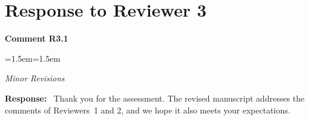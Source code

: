 \documentclass[11pt]{article}
\newcommand{\reviewer}[1]{\section*{Response to Reviewer #1}}
\newenvironment{comment}[1]
  {\par\medskip\noindent\textbf{Comment #1}\par
   \begin{list}{}{\leftmargin=1.5em\rightmargin=1.5em}\item\color{commentcolor}\itshape}
  {\end{list}}
\newenvironment{response}
  {\par\noindent\textbf{Response:}\ }
  {\par}
\begin{document}
\reviewer{3}

\begin{comment}{R3.1}
Minor Revisions
\end{comment}
\begin{response}
Thank you for the assessment. The revised manuscript addresses the comments of Reviewers~1 and
2, and we hope it also meets your expectations.
\end{response}
\end{document}
